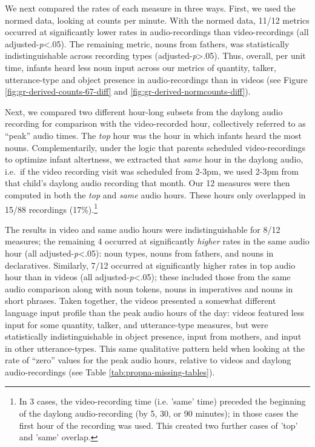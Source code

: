 \documentclass[man]{apa6}
\theoremstyle{definition}
\theoremstyle{definition}
\theoremstyle{definition}
\theoremstyle{remark}
\begin{document}
We next compared the rates of each measure in three ways. First, we used
the normed data, looking at counts per minute. With the normed data,
11/12 metrics occurred at significantly lower rates in audio-recordings
than video-recordings (all adjusted-\emph{p}\textless{}.05). The
remaining metric, nouns from fathers, was statistically
indistinguishable across recording types
(adjusted-\emph{p}\textgreater{}.05). Thus, overall, per unit time,
infants heard less noun input across our metrics of quantity, talker,
utterance-type and object presence in audio-recordings than in videos
(see Figure \ref{fig:gr-derived-counts-67-diff} and
\ref{fig:gr-derived-normcounts-diff}).

Next, we compared two different hour-long subsets from the daylong audio
recording for comparison with the video-recorded hour, collectively
referred to as \enquote{peak} audio times. The \emph{top} hour was the
hour in which infants heard the most nouns. Complementarily, under the
logic that parents scheduled video-recordings to optimize infant
altertness, we extracted that \emph{same} hour in the daylong audio,
i.e.~if the video recording visit was scheduled from 2-3pm, we used
2-3pm from that child's daylong audio recording that month. Our 12
measures were then computed in both the \emph{top} and \emph{same} audio
hours. These hours only overlapped in 15/88 recordings
(17\%).\footnote{In 3 cases, the video-recording time (i.e. 'same' time) preceded the beginning of the daylong audio-recording (by 5, 30, or 90 minutes); in those cases the first hour of the recording was used. This created two further cases of 'top' and 'same' overlap.}

The results in video and same audio hours were indistinguishable for
8/12 measures; the remaining 4 occurred at significantly \emph{higher}
rates in the same audio hour (all adjusted-\emph{p}\textless{}.05): noun
types, nouns from fathers, and nouns in declaratives. Similarly, 7/12
occurred at significantly higher rates in top audio hour than in videos
(all adjusted-\emph{p}\textless{}.05); these included those from the
same audio comparison along with noun tokens, nouns in imperatives and
nouns in short phrases. Taken together, the videos presented a somewhat
different language input profile than the peak audio hours of the day:
videos featured less input for some quantity, talker, and utterance-type
measures, but were statistically indistinguishable in object presence,
input from mothers, and input in other utterance-types. This same
qualitative pattern held when looking at the rate of \enquote{zero}
values for the peak audio hours, relative to videos and daylong
audio-recordings (see Table \ref{tab:propna-missing-tables}).
\end{document}
